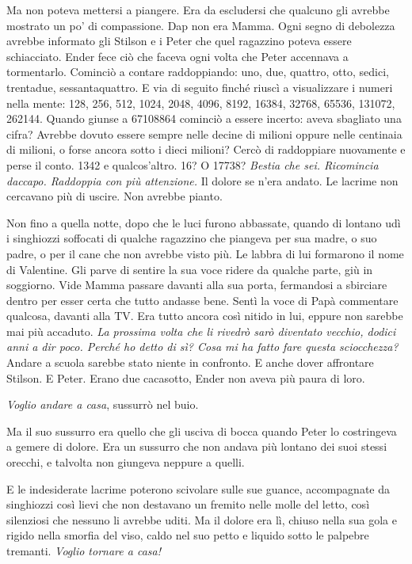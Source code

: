 {Ma non poteva mettersi a piangere. Era da escludersi che qualcuno gli
	avrebbe mostrato un po' di compassione. Dap non era Mamma. Ogni segno di
	debolezza avrebbe informato gli Stilson e i Peter che quel ragazzino
	poteva essere schiacciato. Ender fece ciò che faceva ogni volta che
	Peter accennava a tormentarlo. Cominciò a contare raddoppiando: uno,
	due, quattro, otto, sedici, trentadue, sessantaquattro. E via di seguito
	finché riuscì a visualizzare i numeri nella mente: 128, 256, 512, 1024,
	2048, 4096, 8192, 16384, 32768, 65536, 131072, 262144. Quando giunse a
	67108864 cominciò a essere incerto: aveva sbagliato una cifra? Avrebbe
	dovuto essere sempre nelle decine di milioni oppure nelle centinaia di
	milioni, o forse ancora sotto i dieci milioni? Cercò di raddoppiare
	nuovamente e perse il conto. 1342 e qualcos'altro. 16? O 17738?
	\emph{Bestia che sei. Ricomincia daccapo. Raddoppia con più attenzione.}
	Il dolore se n'era andato. Le lacrime non cercavano più di uscire. Non
	avrebbe pianto.}

{Non fino a quella notte, dopo che le luci furono abbassate, quando di
	lontano udì i singhiozzi soffocati di qualche ragazzino che piangeva per
	sua madre, o suo padre, o per il cane che non avrebbe visto più. Le
	labbra di lui formarono il nome di Valentine. Gli parve di sentire la
	sua voce ridere da qualche parte, giù in soggiorno. Vide Mamma passare
	davanti alla sua porta, fermandosi a sbirciare dentro per esser certa
	che tutto andasse bene. Sentì la voce di Papà commentare qualcosa,
	davanti alla TV. Era tutto ancora così nitido in lui, eppure non sarebbe
	mai più accaduto. \emph{La prossima volta che li rivedrò sarò diventato
		vecchio, dodici anni a dir poco. Perché ho detto di sì? Cosa mi ha fatto
		fare questa sciocchezza?} Andare a scuola sarebbe stato niente in
	confronto. E anche dover affrontare Stilson. E Peter. Erano due
	cacasotto, Ender non aveva più paura di loro.}

\emph{{Voglio andare a casa}}{, \emph{} sussurrò nel buio.}

{Ma il suo sussurro era quello che gli usciva di bocca quando Peter lo
	costringeva a gemere di dolore. Era un sussurro che non andava più
	lontano dei suoi stessi orecchi, e talvolta non giungeva neppure a
	quelli.}

{E le indesiderate lacrime poterono scivolare sulle sue guance,
	accompagnate da singhiozzi così lievi che non destavano un fremito nelle
	molle del letto, così silenziosi che nessuno li avrebbe uditi. Ma il
	dolore era lì, chiuso nella sua gola e rigido nella smorfia del viso,
	caldo nel suo petto e liquido sotto le palpebre tremanti. \emph{Voglio
		tornare a casa!}}

